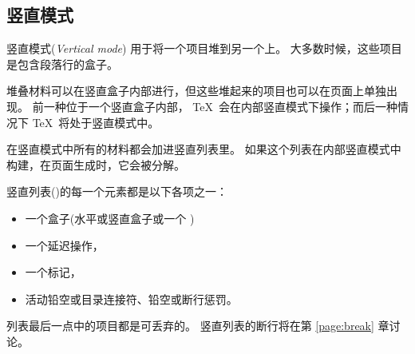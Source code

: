 \documentclass{book}
\begin{document}
\subsection{竖直模式}

竖直模式(\emph{Vertical mode})
用于将一个项目堆到另一个上。
大多数时候，这些项目是包含段落行的盒子。

堆叠材料可以在竖直盒子内部进行，但这些堆起来的项目也可以在页面上单独出现。
前一种位于一个竖直盒子内部，
\TeX\ 会在内部竖直模式下操作；而后一种情况下 \TeX\ 将处于竖直模式中。

在竖直模式中所有的材料都会加进竖直列表里。
如果这个列表在内部竖直模式中构建，在页面生成时，它会被分解。

竖直列表()的每一个元素都是以下各项之一：
\begin{itemize}
  \item 一个盒子(水平或竖直盒子或一个 )
  \item 一个延迟操作，
  \item 一个标记，
  \item 活动铅空或目录连接符、铅空或断行惩罚。
\end{itemize}
列表最后一点中的项目都是可丢弃的。
竖直列表的断行将在第 \ref{page:break} 章讨论。
\end{document}
